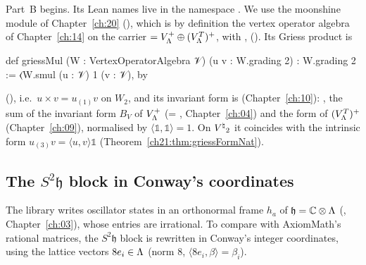 Part~B begins.  Its Lean names live in the namespace .  We use
the moonshine module  of Chapter~\ref{ch:20} (),
which is by definition the vertex operator algebra of Chapter~\ref{ch:14} on the carrier
 $=V_{\Lambda}^+\oplus(V_{\Lambda}^T)^+$, with ,
 ().  Its Griess product is
\begin{leancode}
def griessMul (W : VertexOperatorAlgebra 𝒱) (u v : W.grading 2) : W.grading 2 :=
  ⟨W.smul (u : 𝒱) 1 (v : 𝒱), by
\end{leancode}
(), i.e.\ $u\times v=u_{(1)}v$ on $W_2$, and its invariant form is
 (Chapter~\ref{ch:10}): ,
the sum of the invariant form $B_V$ of $V_{\Lambda}^+$ (= , Chapter~\ref{ch:04}) and the
form  of $(V_{\Lambda}^T)^+$ (Chapter~\ref{ch:09}), normalised by $\langle\mathbb1,\mathbb1\rangle=1$.
On ${V^{\natural}}_2$ it coincides with the intrinsic form $u_{(3)}v=\langle u,v\rangle\mathbb1$
(Theorem~\ref{ch21:thm:griessFormNat}).

\subsection{The \texorpdfstring{$S^2\mathfrak h$}{S2h} block in Conway's coordinates}\label{ch21:sec:conway}

The library writes oscillator states in an orthonormal frame $h_a$ of $\mathfrak h={\mathbb{C}}\otimes{\Lambda}$
(, Chapter~\ref{ch:03}), whose entries are irrational.  To compare with AxiomMath's
rational matrices, the $S^2\mathfrak h$ block is rewritten in Conway's integer coordinates, using the
lattice vectors $8e_i\in{\Lambda}$ (norm $8$, $\langle8e_i,\beta\rangle=\beta_i$).

